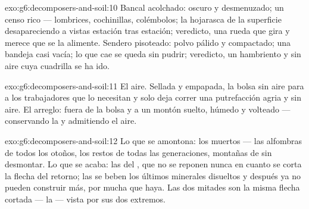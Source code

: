 \begin{solution}{exo:g6:decomposers-and-soil:10}
Bancal acolchado:  oscuro y desmenuzado; un censo rico ---
lombrices, cochinillas, colémbolos; la hojarasca de la superficie
desapareciendo a  vistas estación tras estación; veredicto, una
rueda que gira y merece que se la alimente. Sendero pisoteado: polvo
pálido y compactado; una bandeja casi vacía; lo que cae se queda sin
pudrir; veredicto, un  hambriento y sin aire cuya cuadrilla se ha
ido.
\end{solution}

\begin{solution}{exo:g6:decomposers-and-soil:11}
El aire. Sellada y empapada, la bolsa sin aire para a los trabajadores
que lo necesitan y solo deja correr una putrefacción agria y sin aire.
El arreglo: fuera de la bolsa y a un montón suelto, húmedo y volteado
--- conservando la  y admitiendo el aire.
\end{solution}

\begin{solution}{exo:g6:decomposers-and-soil:12}
Lo que se amontona: los muertos --- las alfombras de todos los otoños,
los restos de todas las generaciones, montañas de  sin
desmontar. Lo que se acaba: las  del , que no se
reponen nunca en cuanto se corta la flecha del retorno; las 
se beben los últimos minerales disueltos y después ya no pueden
construir más, por mucha  que haya. Las dos mitades son la misma
flecha cortada --- la  --- vista por sus dos extremos.
\end{solution}

